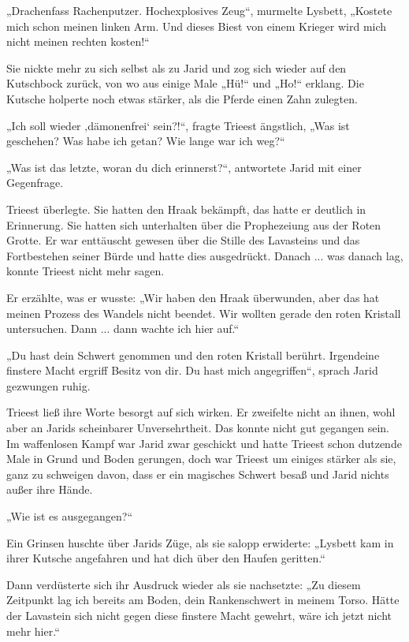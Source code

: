 „Drachenfass Rachenputzer. Hochexplosives Zeug“, murmelte Lysbett, „Kostete mich schon meinen linken Arm. Und dieses Biest von einem Krieger wird mich nicht meinen rechten kosten!“

Sie nickte mehr zu sich selbst als zu Jarid und zog sich wieder auf den Kutschbock zurück, von wo aus einige Male „Hü!“ und „Ho!“ erklang. Die Kutsche holperte noch etwas stärker, als die Pferde einen Zahn zulegten.

„Ich soll wieder ‚dämonenfrei‘ sein?!“, fragte Trieest ängstlich, „Was ist geschehen? Was habe ich getan? Wie lange war ich weg?“

„Was ist das letzte, woran du dich erinnerst?“, antwortete Jarid mit einer Gegenfrage.

Trieest überlegte. Sie hatten den Hraak bekämpft, das hatte er deutlich in Erinnerung. Sie hatten sich unterhalten über die Prophezeiung aus der Roten Grotte. Er war enttäuscht gewesen über die Stille des Lavasteins und das Fortbestehen seiner Bürde und hatte dies ausgedrückt. Danach ... was danach lag, konnte Trieest nicht mehr sagen.

Er erzählte, was er wusste: „Wir haben den Hraak überwunden, aber das hat meinen Prozess des Wandels nicht beendet. Wir wollten gerade den roten Kristall untersuchen. Dann ... dann wachte ich hier auf.“

„Du hast dein Schwert genommen und den roten Kristall berührt. Irgendeine finstere Macht ergriff Besitz von dir. Du hast mich angegriffen“, sprach Jarid gezwungen ruhig.

Trieest ließ ihre Worte besorgt auf sich wirken. Er zweifelte nicht an ihnen, wohl aber an Jarids scheinbarer Unversehrtheit. Das konnte nicht gut gegangen sein. Im waffenlosen Kampf war Jarid zwar geschickt und hatte Trieest schon dutzende Male in Grund und Boden gerungen, doch war Trieest um einiges stärker als sie, ganz zu schweigen davon, dass er ein magisches Schwert besaß und Jarid nichts außer ihre Hände.

„Wie ist es ausgegangen?“

Ein Grinsen huschte über Jarids Züge, als sie salopp erwiderte: „Lysbett kam in ihrer Kutsche angefahren und hat dich über den Haufen geritten.“

Dann verdüsterte sich ihr Ausdruck wieder als sie nachsetzte: „Zu diesem Zeitpunkt lag ich bereits am Boden, dein Rankenschwert in meinem Torso. Hätte der Lavastein sich nicht gegen diese finstere Macht gewehrt, wäre ich jetzt nicht mehr hier.“

